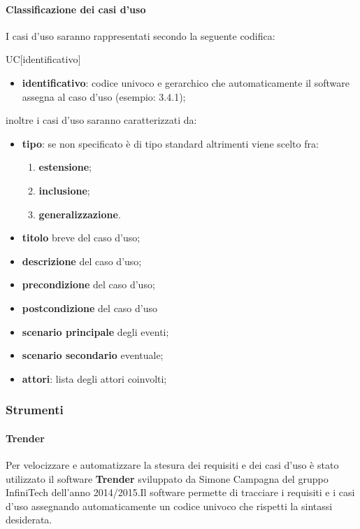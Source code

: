 		\paragraph{Classificazione dei casi d'uso}
		I casi d'uso saranno rappresentati secondo la seguente codifica:
		\begin{center}
			UC[identificativo]
		\end{center}
		\begin{itemize}
			\item \textbf{identificativo}: codice univoco e gerarchico che automaticamente il software assegna al caso d'uso (esempio: 3.4.1);
		\end{itemize}
		inoltre i casi d'uso saranno caratterizzati da:
		\begin{itemize}
			\item \textbf{tipo}: se non specificato è di tipo standard altrimenti viene scelto fra:
			\begin{enumerate}
				\item \textbf{estensione};
				\item \textbf{inclusione};
				\item \textbf{generalizzazione}.
			\end{enumerate}
			\item \textbf{titolo} breve del caso d'uso;
			\item \textbf{descrizione} del caso d'uso;
			\item \textbf{precondizione} del caso d'uso;
			\item \textbf{postcondizione} del caso d'uso 
			\item \textbf{scenario principale} degli eventi;
			\item \textbf{scenario secondario} eventuale;
			\item \textbf{attori}: lista degli attori coinvolti;
		\end{itemize}
\subsubsection{Strumenti}
	\paragraph{Trender}
	Per velocizzare e automatizzare la stesura dei requisiti e dei casi d'uso è stato utilizzato il software \textbf{Trender} sviluppato da Simone Campagna del gruppo InfiniTech dell'anno 2014/2015.Il software permette di tracciare i requisiti e i casi d'uso assegnando automaticamente un codice univoco che rispetti la sintassi desiderata.